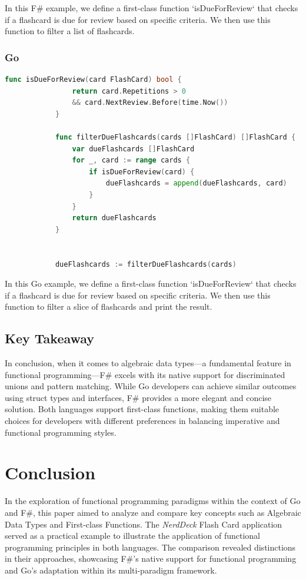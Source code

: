         In this F\# example, we define a first-class function `isDueForReview` that checks if a flashcard is due for review based on specific criteria. We then use this function to filter a list of flashcards.
        
    \subsection*{Go}    
        \begin{lstlisting}[language=go, firstnumber=1, caption={FlashCard representation in F\#}, label=l:flashcardfsharp]
            func isDueForReview(card FlashCard) bool {
                return card.Repetitions > 0 
                && card.NextReview.Before(time.Now())
            }
            
            func filterDueFlashcards(cards []FlashCard) []FlashCard {
                var dueFlashcards []FlashCard
                for _, card := range cards {
                    if isDueForReview(card) {
                        dueFlashcards = append(dueFlashcards, card)
                    }
                }
                return dueFlashcards
            }
            
    
            dueFlashcards := filterDueFlashcards(cards)
            \end{lstlisting}
            
            In this Go example, we define a first-class function `isDueForReview` that checks if a flashcard is due for review based on specific criteria. We then use this function to filter a slice of flashcards and print the result.

    \section{Key Takeaway}\label{sec:keytakeaway}
    In conclusion, when it comes to algebraic data types—a fundamental feature in functional programming—F\# excels with its native support for discriminated unions and pattern matching. While Go developers can achieve similar outcomes using struct types and interfaces, F\# provides a more elegant and concise solution. Both languages support first-class functions, making them suitable choices for developers with different preferences in balancing imperative and functional programming styles.


\chapter{Conclusion}\label{chap:conclusion}
In the exploration of functional programming paradigms within the context of Go and F\#, this paper aimed to analyze and compare key concepts such as Algebraic Data Types and First-class Functions. The \textit{NerdDeck} Flash Card application served as a practical example to illustrate the application of functional programming principles in both languages. The comparison revealed distinctions in their approaches, showcasing F\#'s native support for functional programming and Go's adaptation within its multi-paradigm framework.
